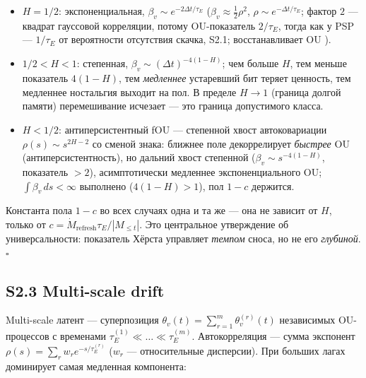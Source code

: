 \documentclass[12pt]{iopart}
\providecommand{\tightlist}{\setlength{\itemsep}{0pt}\setlength{\parskip}{0pt}}
\begin{document}
\begin{itemize}

\tightlist

\item

  \(H = 1/2\): экспоненциальная, \(\beta_v \sim e^{-2\Delta t/\tau_E}\) (\(\beta_v \approx \tfrac12\rho^2\), \(\rho \sim e^{-\Delta t/\tau_E}\); фактор \(2\) --- квадрат гауссовой корреляции, потому OU-показатель \(2/\tau_E\), тогда как у PSP --- \(1/\tau_E\) от вероятности отсутствия скачка, S2.1; восстанавливает OU \cite{Andriishin2026b}).

\item

  \(1/2 < H < 1\): степенная, \(\beta_v \sim (\Delta t)^{-4(1-H)}\); чем больше \(H\), тем меньше показатель \(4(1-H)\), тем \emph{медленнее} устаревший бит теряет ценность, тем медленнее ностальгия выходит на пол. В пределе \(H \to 1\) (граница долгой памяти) перемешивание исчезает --- это граница допустимого класса.

\item

  \(H < 1/2\): антиперсистентный fOU --- степенной хвост автоковариации \(\rho(s) \sim s^{2H-2}\) со сменой знака: ближнее поле декоррелирует \emph{быстрее} OU (антиперсистентность), но дальний хвост степенной (\(\beta_v \sim s^{-4(1-H)}\), показатель \(> 2\)), асимптотически медленнее экспоненциального OU; \(\int\beta_v\,ds < \infty\) выполнено (\(4(1-H) > 1\)), пол \(1-c\) держится.

\end{itemize}



Константа пола \(1-c\) во всех случаях одна и та же --- она не зависит от \(H\), только от \(c = \dot M_{\text{refresh}}\tau_E/|M_{\le t}|\). Это центральное утверждение об универсальности: показатель Хёрста управляет \emph{темпом} сноса, но не его \emph{глубиной}. \(\square\)



\subsection{S2.3 Multi-scale drift}\label{s2.3-multi-scale-drift}



Multi-scale латент --- суперпозиция \(\theta_v(t) = \sum_{r=1}^m \theta_v^{(r)}(t)\) независимых OU-процессов с временами \(\tau_E^{(1)} \ll \dots \ll \tau_E^{(m)}\). Автокорреляция --- сумма экспонент \(\rho(s) = \sum_r w_r e^{-s/\tau_E^{(r)}}\) (\(w_r\) --- относительные дисперсии). При больших лагах доминирует самая медленная компонента:
\end{document}
